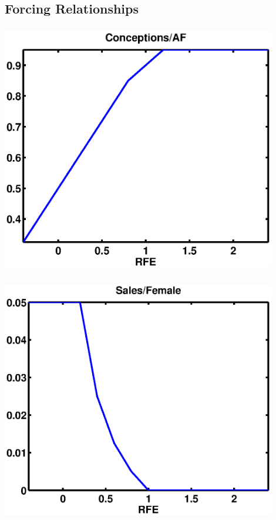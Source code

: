 \documentclass[mathserif]{beamer}
\begin{document}
\subsection{Forcing Relationships}
\begin{frame}
  \begin{center}
    \frametitle{\insertsubsection}
    \includegraphics[width=0.9\textwidth]{conceptions}
  \end{center}
\end{frame}

\begin{frame}
  \begin{center}
    \frametitle{\insertsubsection}
    \includegraphics[width=0.9\textwidth]{salefem}
  \end{center}
\end{frame}
\end{document}
